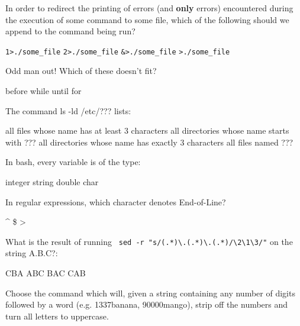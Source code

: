 \documentclass[a4paper,11pt]{exam}
\newcommand{\shell}[1]{\texttt{#1}}
\begin{document}
\begin{questions}
	\question
  In order to redirect the printing of errors (and \textbf{only} errors) encountered during the execution of some command to some file, which of the following should we append to the command being run?

	\begin{oneparchoices}
	  \choice \shell{1>./some\_file} 
		\CorrectChoice \shell{2>./some\_file} 
		\choice \shell{\&>./some\_file} 
		\choice \shell{>./some\_file}
	\end{oneparchoices}
	
	\question
	Odd man out! Which of these doesn't fit?
	
	\begin{oneparchoices}
		\CorrectChoice before
		\choice while
		\choice until
		\choice for
	\end{oneparchoices}

	\question
	The command ls -ld /etc/??? lists:
	\begin{oneparchoices}
		\choice all files whose name has at least 3 characters
		\choice all directories whose name starts with ???
    \CorrectChoice all directories whose name has exactly 3 characters
	  \choice all files named ???
	\end{oneparchoices}
	
	\question
  In bash, every variable is of the type:
	
	\begin{oneparchoices}
		\choice integer
		\CorrectChoice string
		\choice double
		\choice char
	\end{oneparchoices}
	
	\question
  In regular expressions, which character denotes End-of-Line?

	\begin{oneparchoices}
		\choice \textasciicircum
		\CorrectChoice \$
		\choice >
		\choice *
	\end{oneparchoices}

	\question
	What is the result of running \verb| sed -r "s/(.*)\.(.*)\.(.*)/\2\1\3/"| on the string A.B.C?:
	
	\begin{oneparchoices}
		\choice CBA
		\choice ABC
		\CorrectChoice BAC
		\choice CAB
	\end{oneparchoices}
	
	\question
	Choose the command which will, given a string containing any number of digits followed by a word (e.g. 1337banana, 90000mango), strip off the numbers and turn all letters to uppercase.


\end{questions}
\end{document}
